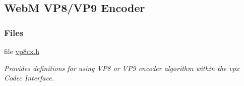 \hypertarget{group__vp8__encoder}{}\subsection{WebM V\+P8/\+V\+P9 Encoder}
\label{group__vp8__encoder}
\subsubsection*{Files}
\begin{DoxyCompactItemize}
\item 
file \hyperlink{vp8cx_8h}{vp8cx.\+h}
\begin{DoxyCompactList}\small\item\em Provides definitions for using V\+P8 or V\+P9 encoder algorithm within the vpx Codec Interface. \end{DoxyCompactList}\end{DoxyCompactItemize}
